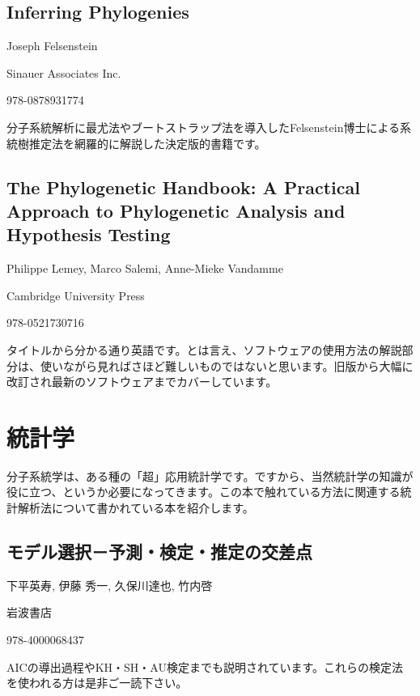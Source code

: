 \documentclass[titlepage,10pt,a4paper]{jsbook}
\begin{document}
\subsection*{Inferring Phylogenies}
\begin{description}\small\setlength{\baselineskip}{1.1em}
\item[著者] Joseph Felsenstein
\item[出版社] Sinauer Associates Inc.
\item[ISBN13] 978-0878931774
\end{description}
分子系統解析に最尤法やブートストラップ法を導入したFelsenstein博士による系統樹推定法を網羅的に解説した決定版的書籍です。

\subsection*{The Phylogenetic Handbook: A Practical Approach to Phylogenetic Analysis and Hypothesis Testing}
\begin{description}\small\setlength{\baselineskip}{1.1em}
\item[編者] Philippe Lemey, Marco Salemi, Anne-Mieke Vandamme
\item[出版社] Cambridge University Press
\item[ISBN13] 978-0521730716
\end{description}
タイトルから分かる通り英語です。とは言え、ソフトウェアの使用方法の解説部分は、使いながら見ればさほど難しいものではないと思います。旧版から大幅に改訂され最新のソフトウェアまでカバーしています。

\section{統計学}\label{section:statisticsbook}

分子系統学は、ある種の「超」応用統計学です。ですから、当然統計学の知識が役に立つ、というか必要になってきます。この本で触れている方法に関連する統計解析法について書かれている本を紹介します。

\subsection*{モデル選択－予測・検定・推定の交差点}
\begin{description}\small\setlength{\baselineskip}{1.1em}
\item[著者] 下平英寿, 伊藤 秀一, 久保川達也, 竹内啓
\item[出版社] 岩波書店
\item[ISBN13] 978-4000068437
\end{description}
AICの導出過程やKH・SH・AU検定までも説明されています。これらの検定法を使われる方は是非ご一読下さい。
\end{document}
